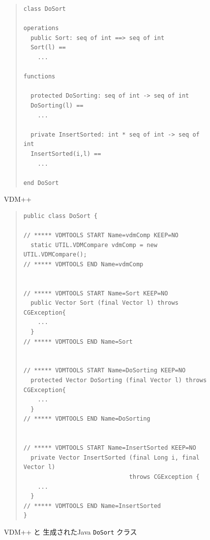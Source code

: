 \documentclass[\pformat,11pt]{jarticle}
\begin{document}
\begin{figure}
\begin{center}
\begin{quote}
\begin{small}
\begin{verbatim}
class DoSort

operations
  public Sort: seq of int ==> seq of int
  Sort(l) ==
    ...

functions

  protected DoSorting: seq of int -> seq of int
  DoSorting(l) ==
    ...

  private InsertSorted: int * seq of int -> seq of int
  InsertSorted(i,l) ==
    ...

end DoSort
\end{verbatim}
\end{small}
\end{quote}
VDM++
\begin{quote}
\begin{small}
\begin{verbatim}
public class DoSort {

// ***** VDMTOOLS START Name=vdmComp KEEP=NO
  static UTIL.VDMCompare vdmComp = new UTIL.VDMCompare();
// ***** VDMTOOLS END Name=vdmComp


// ***** VDMTOOLS START Name=Sort KEEP=NO
  public Vector Sort (final Vector l) throws CGException{
    ...
  }
// ***** VDMTOOLS END Name=Sort


// ***** VDMTOOLS START Name=DoSorting KEEP=NO
  protected Vector DoSorting (final Vector l) throws CGException{
    ...
  }
// ***** VDMTOOLS END Name=DoSorting


// ***** VDMTOOLS START Name=InsertSorted KEEP=NO
  private Vector InsertSorted (final Long i, final Vector l)
                              throws CGException {
    ...
  }
// ***** VDMTOOLS END Name=InsertSorted
}
\end{verbatim}
\end{small}
\end{quote}
\caption{VDM++ と 生成されたJava {\tt DoSort} クラス\label{fig:vdmjava}}
\end{center}
\end{figure}
\end{document}
